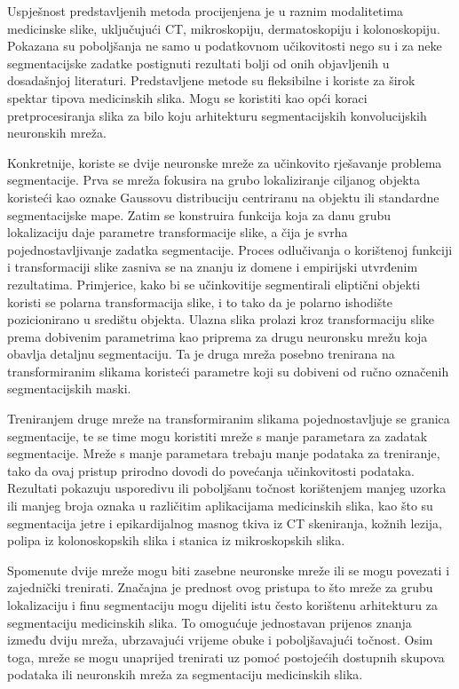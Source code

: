 Uspješnost predstavljenih metoda procijenjena je u raznim modalitetima medicinske slike, uključujući CT, mikroskopiju, dermatoskopiju i kolonoskopiju. Pokazana su poboljšanja ne samo u podatkovnom učikovitosti nego su i za neke segmentacijske zadatke postignuti rezultati bolji od onih objavljenih u dosadašnjoj literaturi. Predstavljene metode su fleksibilne i koriste za širok spektar tipova medicinskih slika. Mogu se koristiti kao opći koraci pretprocesiranja slika za bilo koju arhitekturu segmentacijskih konvolucijskih neuronskih mreža.

Konkretnije, koriste se dvije neuronske mreže za učinkovito rješavanje problema segmentacije. Prva se mreža fokusira na grubo lokaliziranje ciljanog objekta koristeći kao oznake Gaussovu distribuciju centriranu na objektu ili standardne segmentacijske mape. Zatim se konstruira funkcija koja za danu grubu lokalizaciju daje parametre transformacije slike, a čija je svrha pojednostavljivanje zadatka segmentacije. Proces odlučivanja o korištenoj funkciji i transformaciji slike zasniva se na znanju iz domene i empirijski utvrđenim rezultatima. Primjerice, kako bi se učinkovitije segmentirali eliptični objekti koristi se polarna transformacija slike, i to tako da je polarno ishodište pozicionirano u središtu objekta. Ulazna slika prolazi kroz transformaciju slike prema dobivenim parametrima kao priprema za drugu neuronsku mrežu koja obavlja detaljnu segmentaciju. Ta je druga mreža posebno trenirana na transformiranim slikama koristeći parametre koji su dobiveni od ručno označenih segmentacijskih maski.

Treniranjem druge mreže na transformiranim slikama pojednostavljuje se granica segmentacije, te se time mogu koristiti mreže s manje parametara za zadatak segmentacije. Mreže s manje parametara trebaju manje podataka za treniranje, tako da ovaj pristup prirodno dovodi do povećanja učinkovitosti podataka. Rezultati pokazuju usporedivu ili poboljšanu točnost korištenjem manjeg uzorka ili manjeg broja oznaka u različitim aplikacijama medicinskih slika, kao što su segmentacija jetre i epikardijalnog masnog tkiva iz CT skeniranja, kožnih lezija, polipa iz kolonoskopskih slika i stanica iz mikroskopskih slika.

Spomenute dvije mreže mogu biti zasebne neuronske mreže ili se mogu povezati i zajednički trenirati. Značajna je prednost ovog pristupa to što mreže za grubu lokalizaciju i finu segmentaciju mogu dijeliti istu često korištenu arhitekturu za segmentaciju medicinskih slika. To omogućuje jednostavan prijenos znanja između dviju mreža, ubrzavajući vrijeme obuke i poboljšavajući točnost. Osim toga, mreže se mogu unaprijed trenirati uz pomoć postojećih dostupnih skupova podataka ili neuronskih mreža za segmentaciju medicinskih slika.

